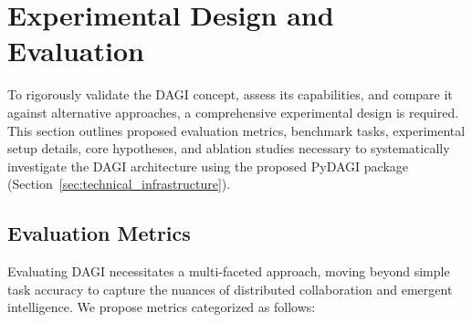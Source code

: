 \documentclass[12pt]{amsart}
\begin{document}
\section{Experimental Design and Evaluation}
\label{sec:experiment}
To rigorously validate the DAGI concept, assess its capabilities, and compare it against alternative approaches, a comprehensive experimental design is required. This section outlines proposed evaluation metrics, benchmark tasks, experimental setup details, core hypotheses, and ablation studies necessary to systematically investigate the DAGI architecture using the proposed PyDAGI package (Section~\ref{sec:technical_infrastructure}).

\subsection{Evaluation Metrics}
\label{subsec:evaluation_metrics}
Evaluating DAGI necessitates a multi-faceted approach, moving beyond simple task accuracy to capture the nuances of distributed collaboration and emergent intelligence. We propose metrics categorized as follows:
\end{document}
